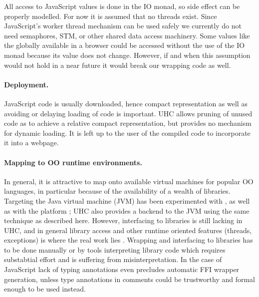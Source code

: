 \documentclass{llncs}
\begin{document}
All access to JavaScript values is done in the IO monad, so side effect can be properly modelled.
For now it is assumed that no threads exist.
Since JavaScript's worker thread mechanism can be used safely we currently do not need
 semaphores, STM, or other shared data access machinery.
Some values like the globally available  in a browser could be accessed without the use of the IO monad because its value does not change.
However, if and when this assumption would not hold in a near future it would break our wrapping code as well.


\paragraph{Deployment.}

JavaScript code is usually downloaded, hence compact representation as well as avoiding or delaying loading of code is
important.
UHC allows pruning of unused code as to achieve a relative compact representation,
but provides no mechanism for dynamic loading.
It is left up to the user of the compiled code to incorporate it into a webpage.


\paragraph{Mapping to OO runtime environments.}

In general, it is attractive to map onto available virtual machines for popular OO languages,
in particular because of the availability of a wealth of libraries.
Targeting the Java virtual machine (JVM) has been experimented with
\cite{wakeling98haskell-to-java,func:lazy:java:parser-combinator,stewart02mthesis-multiparadigm-jit,tullsen96haskell-to-java},
as well as with the  platform \cite{monteiro05functional-to-dotnet,www04haskell-dotnet,meijer07mondrian,meijer01dotnet-scripting-mondrian};
UHC also provides a backend to the JVM \cite{func:lazy:java:parser-combinator}
using the same technique as described here.
However, interfacing to libraries is still lacking in UHC, and in general library access and other
runtime oriented features (threads, exceptions)
is where the real work lies \cite{www12ghc-faq}.
Wrapping and interfacing to libraries has to be done manually or by tools interpreting library code which requires substabtial effort and is
suffering from misinterpretation.
In the case of JavaScript lack of typing annotations even precludes automatic FFI wrapper generation,
unless type annotations in comments could be trustworthy and formal enough to be used instead.
\end{document}
